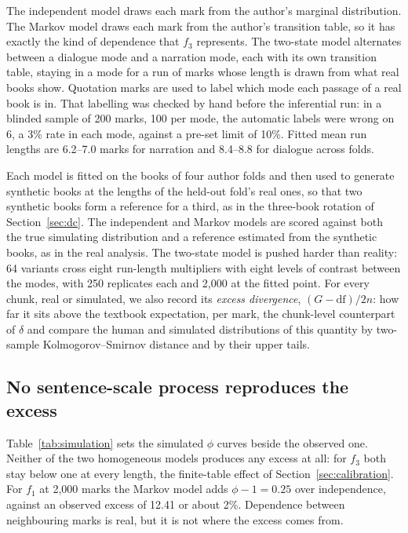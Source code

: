 \documentclass[11pt]{article}
\newcommand{\fOne}{\ensuremath{f_1}\xspace}
\newcommand{\fThree}{\ensuremath{f_3}\xspace}
\begin{document}
The independent model draws each mark from the author's marginal
distribution.  The Markov model draws each mark from the author's
transition table, so it has exactly the kind of dependence that \fThree
represents.  The two-state model alternates between a dialogue mode and a
narration mode, each with its own transition table, staying in a mode for
a run of marks whose length is drawn from what real books show.
Quotation marks are used to label which mode each passage of a real book
is in.  That labelling was checked by hand before the inferential run: in
a blinded sample of 200 marks, 100 per mode, the automatic labels were
wrong on 6, a 3\% rate in each mode, against a pre-set limit of 10\%.
Fitted mean run lengths are 6.2--7.0 marks for narration and 8.4--8.8 for
dialogue across folds.

Each model is fitted on the books of four author folds and then used to
generate synthetic books at the lengths of the held-out fold's real ones,
so that two synthetic books form a reference for a third, as in the
three-book rotation of Section~\ref{sec:dc}.  The independent and Markov
models are scored against both the true simulating distribution and a
reference estimated from the synthetic books, as
in the real analysis.  The two-state model is pushed harder than reality:
64 variants cross eight run-length multipliers with eight levels of
contrast between the modes, with 250 replicates each and 2,000 at the
fitted point.  For every chunk, real or simulated, we also record its
\emph{excess divergence}, \((G - \mathrm{df})/2n\): how far it sits
above the textbook expectation, per mark, the chunk-level counterpart of
\(\delta\) and compare the human and simulated distributions of this
quantity by two-sample Kolmogorov--Smirnov distance and by their upper
tails.

\subsection{No sentence-scale process reproduces the excess}

Table~\ref{tab:simulation} sets the simulated \(\phi\) curves beside the
observed one.  Neither of the two homogeneous models produces any excess
at all: for \fThree both stay below one at every length, the finite-table
effect of Section~\ref{sec:calibration}.  For \fOne at 2,000 marks the
Markov model adds \(\phi - 1 = 0.25\) over independence, against an
observed excess of 12.41 or about 2\%.  Dependence between neighbouring
marks is real, but it is not where the excess comes from.
\end{document}
